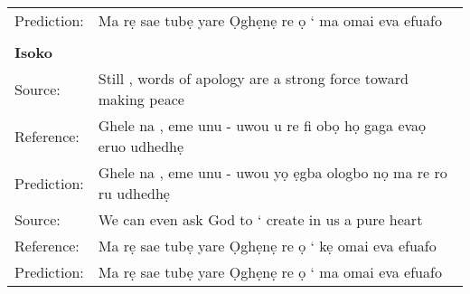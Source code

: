 \documentclass{article} %
\begin{document}
\begin{table}[h]
\begin{center}
\begin{tabular}{ll}
	 Prediction: & Ma rẹ sae tubẹ yare Ọghẹnẹ re ọ ‘ ma omai eva efuafo \\ 
     \\
     \toprule
     \textbf{Isoko}  & \\
    \toprule
    \toprule
	 Source: &    Still , words of apology are a strong force toward making peace \\
	 Reference: & Ghele na , eme unu - uwou u re fi obọ họ gaga evaọ eruo udhedhẹ \\
	 Prediction: & Ghele na , eme unu - uwou yọ ẹgba ologbo nọ ma re ro ru udhedhẹ \\
  \midrule
	 Source:  &   We can even ask God to ‘ create in us a pure heart \\
	 Reference: &  Ma rẹ sae tubẹ yare Ọghẹnẹ re ọ ‘ kẹ omai eva efuafo \\
	 Prediction: & Ma rẹ sae tubẹ yare Ọghẹnẹ re ọ ‘ ma omai eva efuafo \\ 
  \end{tabular}
\end{center}
\end{table}
\end{document}
